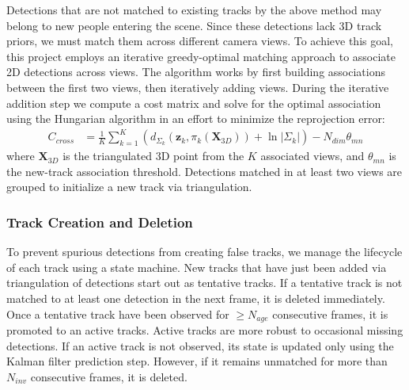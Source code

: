Detections that are not matched to existing tracks by the above method may belong to new people entering the scene. Since these detections lack 3D track priors, we must match them across different camera views. To achieve this goal, this project employs an iterative greedy-optimal matching approach to associate 2D detections across views. The algorithm works by first building associations between the first two views, then iteratively adding views. During the iterative addition step we compute a cost matrix and solve for the optimal association using the Hungarian algorithm in an effort to minimize the reprojection error:
\begin{align*}
    C_{cross} &= \frac{1}{K}\sum_{k=1}^K \left( d_{\Sigma_k}(\mathbf{z}_k, \pi_k(\mathbf{X}_{3D})) + \ln|\Sigma_k| \right) - N_{dim}\theta_{mn}
\end{align*}
where $\mathbf{X}_{3D}$ is the triangulated 3D point from the $K$ associated views, and $\theta_{mn}$ is the new-track association threshold. Detections matched in at least two views are grouped to initialize a new track via triangulation.


\subsubsection{Track Creation and Deletion} \label{arch-tracks}

To prevent spurious detections from creating false tracks, we manage the lifecycle of each track using a state machine. New tracks that have just been added via triangulation of detections start out as tentative tracks.  If a tentative track is not matched to at least one detection in the next frame, it is deleted immediately. Once a tentative track have been observed for $\ge N_{age}$ consecutive frames, it is promoted to an active tracks. Active tracks are more robust to occasional missing detections. If an active track is not observed, its state is updated only using the Kalman filter prediction step. However, if it remains unmatched for more than $N_{inv}$ consecutive frames, it is deleted.

